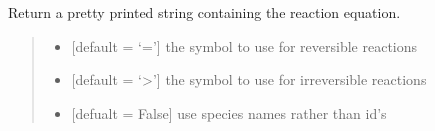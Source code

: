 \documentclass[letterpaper,12pt,english]{sphinxmanual}
\begin{document}
\begin{fulllineitems}
\begin{fulllineitems}
\end{fulllineitems}


\begin{fulllineitems}
\label{\detokenize{api/core:cbmpy.CBModel.Reaction.getEquation}}
\pysigstartsignatures
\pysiglinewithargsret
{}
{\sphinxparamcomma {}\sphinxparamcomma {}}
{}
\pysigstopsignatures
\sphinxAtStartPar
Return a pretty printed string containing the reaction equation.
\begin{quote}\begin{description}
\begin{itemize}
\item {} 
\sphinxAtStartPar
{} \textendash{} {[}default = ‘=’{]} the symbol to use for reversible reactions

\item {} 
\sphinxAtStartPar
{} \textendash{} {[}default = ‘\textgreater{}’{]} the symbol to use for irreversible reactions

\item {} 
\sphinxAtStartPar
{} \textendash{} {[}defualt = False{]} use species names rather than id’s

\end{itemize}

\end{description}\end{quote}

\end{fulllineitems}


\end{fulllineitems}

\end{document}
